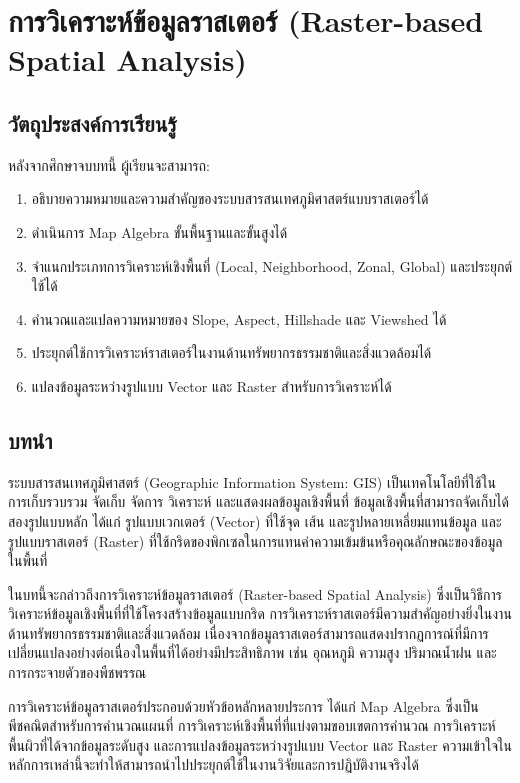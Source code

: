 \chapter{การวิเคราะห์ข้อมูลราสเตอร์ (Raster-based Spatial Analysis)}

\section{วัตถุประสงค์การเรียนรู้}
หลังจากศึกษาจบบทนี้ ผู้เรียนจะสามารถ:
\begin{enumerate}
    \item อธิบายความหมายและความสำคัญของระบบสารสนเทศภูมิศาสตร์แบบราสเตอร์ได้
    \item ดำเนินการ Map Algebra ขั้นพื้นฐานและขั้นสูงได้
    \item จำแนกประเภทการวิเคราะห์เชิงพื้นที่ (Local, Neighborhood, Zonal, Global) และประยุกต์ใช้ได้
    \item คำนวณและแปลความหมายของ Slope, Aspect, Hillshade และ Viewshed ได้
    \item ประยุกต์ใช้การวิเคราะห์ราสเตอร์ในงานด้านทรัพยากรธรรมชาติและสิ่งแวดล้อมได้
    \item แปลงข้อมูลระหว่างรูปแบบ Vector และ Raster สำหรับการวิเคราะห์ได้
\end{enumerate}

\section{บทนำ}
ระบบสารสนเทศภูมิศาสตร์ (Geographic Information System: GIS) เป็นเทคโนโลยีที่ใช้ในการเก็บรวบรวม จัดเก็บ จัดการ วิเคราะห์ และแสดงผลข้อมูลเชิงพื้นที่ ข้อมูลเชิงพื้นที่สามารถจัดเก็บได้สองรูปแบบหลัก ได้แก่ รูปแบบเวกเตอร์ (Vector) ที่ใช้จุด เส้น และรูปหลายเหลี่ยมแทนข้อมูล และรูปแบบราสเตอร์ (Raster) ที่ใช้กริดของพิกเซลในการแทนค่าความเข้มข้นหรือคุณลักษณะของข้อมูลในพื้นที่

ในบทนี้จะกล่าวถึงการวิเคราะห์ข้อมูลราสเตอร์ (Raster-based Spatial Analysis) ซึ่งเป็นวิธีการวิเคราะห์ข้อมูลเชิงพื้นที่ที่ใช้โครงสร้างข้อมูลแบบกริด การวิเคราะห์ราสเตอร์มีความสำคัญอย่างยิ่งในงานด้านทรัพยากรธรรมชาติและสิ่งแวดล้อม เนื่องจากข้อมูลราสเตอร์สามารถแสดงปรากฏการณ์ที่มีการเปลี่ยนแปลงอย่างต่อเนื่องในพื้นที่ได้อย่างมีประสิทธิภาพ เช่น อุณหภูมิ ความสูง ปริมาณน้ำฝน และการกระจายตัวของพืชพรรณ

การวิเคราะห์ข้อมูลราสเตอร์ประกอบด้วยหัวข้อหลักหลายประการ ได้แก่ Map Algebra ซึ่งเป็นพีชคณิตสำหรับการคำนวณแผนที่ การวิเคราะห์เชิงพื้นที่ที่แบ่งตามขอบเขตการคำนวณ การวิเคราะห์พื้นผิวที่ได้จากข้อมูลระดับสูง และการแปลงข้อมูลระหว่างรูปแบบ Vector และ Raster ความเข้าใจในหลักการเหล่านี้จะทำให้สามารถนำไปประยุกต์ใช้ในงานวิจัยและการปฏิบัติงานจริงได้
\label{sec:raster-intro}

